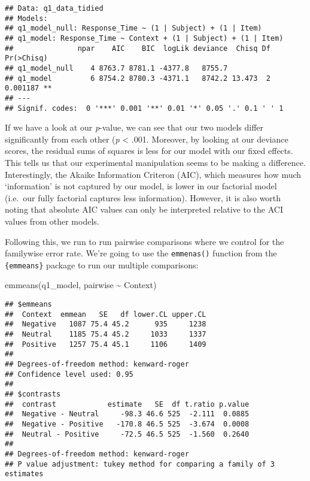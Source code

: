 \documentclass[
]{article}
\newenvironment{Shaded}{\begin{snugshade}}{\end{snugshade}}
\newcommand{\FunctionTok}[1]{\textcolor[rgb]{0.00,0.00,0.00}{#1}}
\newcommand{\NormalTok}[1]{#1}
\newcommand{\SpecialCharTok}[1]{\textcolor[rgb]{0.00,0.00,0.00}{#1}}
\begin{document}
\begin{verbatim}
## Data: q1_data_tidied
## Models:
## q1_model_null: Response_Time ~ (1 | Subject) + (1 | Item)
## q1_model: Response_Time ~ Context + (1 | Subject) + (1 | Item)
##               npar    AIC    BIC  logLik deviance  Chisq Df Pr(>Chisq)   
## q1_model_null    4 8763.7 8781.1 -4377.8   8755.7                        
## q1_model         6 8754.2 8780.3 -4371.1   8742.2 13.473  2   0.001187 **
## ---
## Signif. codes:  0 '***' 0.001 '**' 0.01 '*' 0.05 '.' 0.1 ' ' 1
\end{verbatim}

If we have a look at our \emph{p}-value, we can see that our two models
differ significantly from each other (\emph{p} \textless{} .001.
Moreover, by looking at our deviance scores, the residual sums of
squares is less for our model with our fixed effects. This tells us that
our experimental manipulation seems to be making a difference.
Interestingly, the Akaike Information Criteron (AIC), which measures how
much `information' is not captured by our model, is lower in our
factorial model (i.e.~our fully factorial captures less information).
However, it is also worth noting that absolute AIC values can only be
interpreted relative to the ACI values from other models.

Following this, we run to run pairwise comparisons where we control for
the familywise error rate. We're going to use the \texttt{emmenas()}
function from the \texttt{\{emmeans\}} package to run our multiple
comparisons:

\begin{Shaded}
\begin{Highlighting}[]
\FunctionTok{emmeans}\NormalTok{(q1\_model, pairwise }\SpecialCharTok{\textasciitilde{}}\NormalTok{ Context)}
\end{Highlighting}
\end{Shaded}

\begin{verbatim}
## $emmeans
##  Context  emmean   SE   df lower.CL upper.CL
##  Negative   1087 75.4 45.2      935     1238
##  Neutral    1185 75.4 45.2     1033     1337
##  Positive   1257 75.4 45.1     1106     1409
## 
## Degrees-of-freedom method: kenward-roger 
## Confidence level used: 0.95 
## 
## $contrasts
##  contrast            estimate   SE  df t.ratio p.value
##  Negative - Neutral     -98.3 46.6 525  -2.111  0.0885
##  Negative - Positive   -170.8 46.5 525  -3.674  0.0008
##  Neutral - Positive     -72.5 46.5 525  -1.560  0.2640
## 
## Degrees-of-freedom method: kenward-roger 
## P value adjustment: tukey method for comparing a family of 3 estimates
\end{verbatim}
\end{document}

